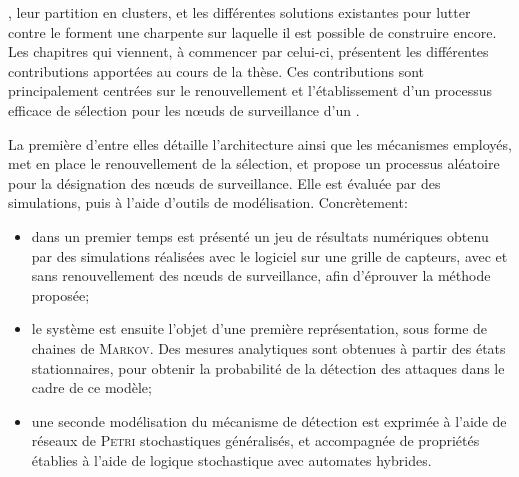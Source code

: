 \vfil
{}, leur partition en clusters, et les différentes solutions existantes pour lutter contre le \dds forment une charpente sur laquelle il est possible de construire encore.
Les chapitres qui viennent, à commencer par celui-ci, présentent les différentes contributions apportées au cours de la thèse.
Ces contributions sont principalement centrées sur le renouvellement et l'établissement d'un processus efficace de sélection pour les nœuds de surveillance d'un \rcs.

La première d'entre elles détaille l'architecture ainsi que les mécanismes employés, met en place le renouvellement de la sélection, et propose un processus aléatoire pour la désignation des nœuds de surveillance.
Elle est évaluée par des simulations, puis à l'aide d'outils de modélisation.
Concrètement:
\begin{itemize}
    \item dans un premier temps est présenté un jeu de résultats numériques obtenu par des simulations réalisées avec le logiciel \nsii sur une grille de capteurs, avec et sans renouvellement des nœuds de surveillance, afin d'éprouver la méthode proposée;
    \item le système est ensuite l'objet d'une première représentation, sous forme de chaines de \textsc{Markov}. Des mesures analytiques sont obtenues à partir des états stationnaires, pour obtenir la probabilité de la détection des attaques dans le cadre de ce modèle;
    \item une seconde modélisation du mécanisme de détection est exprimée à l'aide de réseaux de \textsc{Petri} stochastiques généralisés, et accompagnée de propriétés établies à l'aide de logique stochastique avec automates hybrides.
\end{itemize}
\vfil
